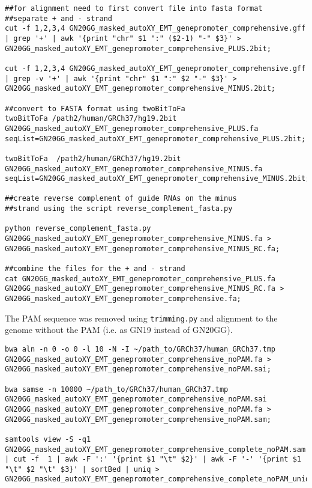 \begin{lstlisting}
##for alignment need to first convert file into fasta format
##separate + and - strand
cut -f 1,2,3,4 GN20GG_masked_autoXY_EMT_genepromoter_comprehensive.gff | grep '+' | awk '{print "chr" $1 ":" ($2-1) "-" $3}' > GN20GG_masked_autoXY_EMT_genepromoter_comprehensive_PLUS.2bit;

cut -f 1,2,3,4 GN20GG_masked_autoXY_EMT_genepromoter_comprehensive.gff | grep -v '+' | awk '{print "chr" $1 ":" $2 "-" $3}' > GN20GG_masked_autoXY_EMT_genepromoter_comprehensive_MINUS.2bit;

##convert to FASTA format using twoBitToFa
twoBitToFa /path2/human/GRCh37/hg19.2bit GN20GG_masked_autoXY_EMT_genepromoter_comprehensive_PLUS.fa seqList=GN20GG_masked_autoXY_EMT_genepromoter_comprehensive_PLUS.2bit;

twoBitToFa  /path2/human/GRCh37/hg19.2bit GN20GG_masked_autoXY_EMT_genepromoter_comprehensive_MINUS.fa seqList=GN20GG_masked_autoXY_EMT_genepromoter_comprehensive_MINUS.2bit;

##create reverse complement of guide RNAs on the minus
##strand using the script reverse_complement_fasta.py

python reverse_complement_fasta.py GN20GG_masked_autoXY_EMT_genepromoter_comprehensive_MINUS.fa > GN20GG_masked_autoXY_EMT_genepromoter_comprehensive_MINUS_RC.fa;

##combine the files for the + and - strand
cat GN20GG_masked_autoXY_EMT_genepromoter_comprehensive_PLUS.fa GN20GG_masked_autoXY_EMT_genepromoter_comprehensive_MINUS_RC.fa > GN20GG_masked_autoXY_EMT_genepromoter_comprehensive.fa;
\end{lstlisting}

The PAM sequence was removed using \verb|trimming.py| and alignment to the genome without the PAM (i.e. as GN19 instead of GN20GG).

\begin{lstlisting}
bwa aln -n 0 -o 0 -l 10 -N -I ~/path_to/GRCh37/human_GRCh37.tmp
GN20GG_masked_autoXY_EMT_genepromoter_comprehensive_noPAM.fa >
GN20GG_masked_autoXY_EMT_genepromoter_comprehensive_noPAM.sai;

bwa samse -n 10000 ~/path_to/GRCh37/human_GRCh37.tmp   
GN20GG_masked_autoXY_EMT_genepromoter_comprehensive_noPAM.sai 
GN20GG_masked_autoXY_EMT_genepromoter_comprehensive_noPAM.fa > 
GN20GG_masked_autoXY_EMT_genepromoter_comprehensive_noPAM.sam;

samtools view -S -q1  GN20GG_masked_autoXY_EMT_genepromoter_comprehensive_complete_noPAM.sam | cut -f  1 | awk -F ':' '{print $1 "\t" $2}' | awk -F '-' '{print $1 "\t" $2 "\t" $3}' | sortBed | uniq > GN20GG_masked_autoXY_EMT_genepromoter_comprehensive_complete_noPAM_unique.bed
\end{lstlisting}

